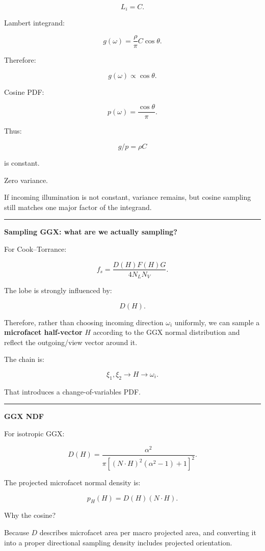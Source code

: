 \[
L_i=C.
\]

Lambert integrand:

\[
g(\omega)
=
\frac{\rho}{\pi}
C
\cos\theta.
\]

Therefore:

\[
g(\omega)\propto\cos\theta.
\]

Cosine PDF:

\[
p(\omega)
=
\frac{\cos\theta}{\pi}.
\]

Thus:

\[
g/p
=
\rho C
\]

is constant.

Zero variance.

If incoming illumination is not constant, variance remains, but cosine sampling still matches one major factor of the integrand.

\begin{center}\rule{0.5\linewidth}{0.5pt}\end{center}

\textbf{Sampling GGX: what are we actually sampling?}

For Cook--Torrance:

\[
f_s=
\frac{D(H)F(H)G}{4N_LN_V}.
\]

The lobe is strongly influenced by:

\[
D(H).
\]

Therefore, rather than choosing incoming direction \(\omega_i\) uniformly, we can sample a \textbf{microfacet half-vector} \(H\) according to the GGX normal distribution and reflect the outgoing/view vector around it.

The chain is:

\[
\xi_1,\xi_2
\rightarrow
H
\rightarrow
\omega_i.
\]

That introduces a change-of-variables PDF.

\begin{center}\rule{0.5\linewidth}{0.5pt}\end{center}

\textbf{GGX NDF}

For isotropic GGX:

\[
D(H)
=
\frac{
\alpha^2
}{
\pi
[
(N\cdot H)^2(\alpha^2-1)+1
]^2
}.
\]

The projected microfacet normal density is:

\[
\boxed{
p_H(H)
=
D(H)(N\cdot H).
}
\]

Why the cosine?

Because \(D\) describes microfacet area per macro projected area, and converting it into a proper directional sampling density includes projected orientation.

